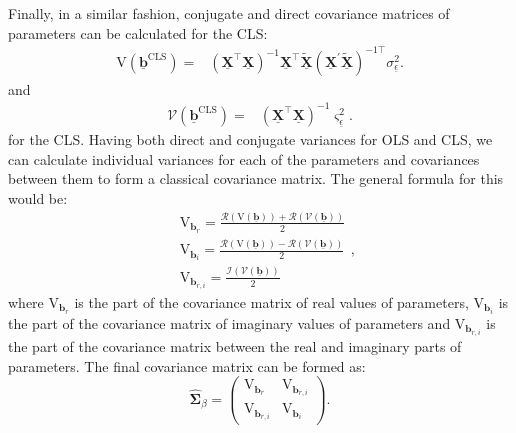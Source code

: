 \documentclass[
]{book}
\begin{document}
Finally, in a similar fashion, conjugate and direct covariance matrices of parameters can be calculated for the CLS:
\begin{equation}
    \begin{aligned}
        \mathrm{V}\left( \underline{\boldsymbol{b}}^{\text{CLS}} \right) =
        & \left( \underline{\mathbf{X}}^\top \underline{\mathbf{X}} \right)^{-1} \underline{\mathbf{X}}^\top \tilde{\underline{\mathbf{X}}} \left( {\underline{\mathbf{X}}}^\prime \tilde{\underline{\mathbf{X}}} \right)^{-1 \top}  \sigma_{\underline{\epsilon}}^2 .
    \end{aligned}
    \label{eq:MCLRCLSConjVar}
\end{equation}
and
\begin{equation}
    \begin{aligned}
        \mathcal{V}\left( \underline{\boldsymbol{b}}^{\text{CLS}} \right) =
        & \left( \underline{\mathbf{X}}^\top \underline{\mathbf{X}} \right)^{-1} \varsigma_{\underline{\epsilon}}^2 .
    \end{aligned}
    \label{eq:MCLRCLSDirVar}
\end{equation}
for the CLS. Having both direct and conjugate variances for OLS and CLS, we can calculate individual variances for each of the parameters and covariances between them to form a classical covariance matrix. The general formula for this would be:
\begin{equation*}
    \begin{aligned}
        & \mathrm{V}_{\boldsymbol{b}_r} = \frac{\mathcal{R}\left(\mathrm{V}\left( \underline{\boldsymbol{b}} \right) \right)+\mathcal{R}\left(\mathcal{V}\left( \underline{\boldsymbol{b}} \right) \right)}{2} \\
        & \mathrm{V}_{\boldsymbol{b}_i} = \frac{\mathcal{R}\left(\mathrm{V}\left( \underline{\boldsymbol{b}} \right) \right)-\mathcal{R}\left(\mathcal{V}\left( \underline{\boldsymbol{b}} \right) \right)}{2} \\
        & \mathrm{V}_{\boldsymbol{b}_{r,i}} = \frac{\mathcal{I}\left(\mathcal{V}\left( \underline{\boldsymbol{b}} \right)\right)}{2}
    \end{aligned},
\end{equation*}
where \(\mathrm{V}_{\boldsymbol{b}_r}\) is the part of the covariance matrix of real values of parameters, \(\mathrm{V}_{\boldsymbol{b}_i}\) is the part of the covariance matrix of imaginary values of parameters and \(\mathrm{V}_{\boldsymbol{b}_{r,i}}\) is the part of the covariance matrix between the real and imaginary parts of parameters. The final covariance matrix can be formed as:
\begin{equation}
    \hat{{\boldsymbol{\Sigma}}}_\beta =
    \begin{pmatrix}
        \mathrm{V}_{\boldsymbol{b}_r} & \mathrm{V}_{\boldsymbol{b}_{r,i}} \\
        \mathrm{V}_{\boldsymbol{b}_{r,i}} & \mathrm{V}_{\boldsymbol{b}_i}
    \end{pmatrix}.
    \label{eq:MCLRCLSVariance}
\end{equation}
\end{document}
